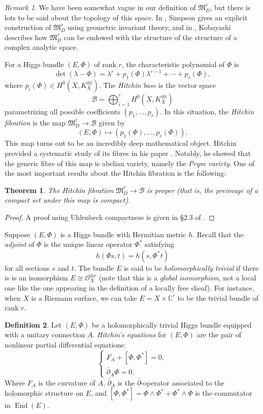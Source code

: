 \documentclass[10pt]{amsart}
\numberwithin{equation}{section}
\def\~#1{\mathscr{#1}}
\newcommand{\C}{\mathbb{C}}
\DeclareMathOperator{\End}{End}
\renewcommand{\frak}[1]{\mathfrak{#1}}
\theoremstyle{plain}
\newtheorem{thm}{Theorem}[section]
\theoremstyle{definition}
\newtheorem{defn}[thm]{Definition}
\theoremstyle{remark}
\newtheorem*{rmk}{Remark}
\begin{document}
\begin{rmk}
    We have been somewhat vague in our definition of $\frak{M}_D^r$, but there is lots to be said about the topology of this space. In \cite{simpson1994}, Simpson gives an explicit construction of $\frak{M}_D^r$ using geometric invariant theory, and in \cite{kobayashi87}, Kobayashi describes how $\frak{M}_D^r$ can be endowed with the structure of the structure of a complex analytic space.
\end{rmk}

For a Higgs bundle $(E, \Phi)$ of rank $r$, the characteristic polynomial of $\Phi$ is
\[\det(\lambda - \Phi) = \lambda^r +p_1(\Phi) \lambda^{r-1} + \cdots + p_r(\Phi),\]
where $p_i(\Phi) \in H^0(X, K_X^{\otimes i})$. The \emph{Hitchin base} is the vector space
\[\~B = \bigoplus_{i=1}^r H^0(X, K_X^{\otimes i})\]
parametrizing all possible coefficients $(p_1, \hdots, p_r)$. In this situation, the \emph{Hitchin fibration} is the map $\frak{M}_D^r \to \~B$ given by
\[(E, \Phi) \mapsto (p_1(\Phi), \hdots, p_r(\Phi)).\]
This map turns out to be an incredibly deep mathematical object. Hitchin provided a systematic study of its fibres in his paper \cite{hitchin1987B}. Notably, he showed that the generic fibre of this map is abelian variety, namely the \emph{Prym variety}. One of the most important results about the Hitchin fibration is the following:
\begin{thm}
    The Hitchin fibration $\frak{M}_D^{r} \to \~B$ is proper (that is, the preimage of a compact set under this map is compact).
\end{thm}
\begin{proof}
A proof using Uhlenbeck compactness is given in \S2.3 of \cite{wentworth2015}.
\end{proof}
Suppose $(E, \Phi)$ is a Higgs bundle with Hermitian metric $h$. Recall that the \emph{adjoint} of $\Phi$ is the unique linear operator $\Phi^*$ satisfying
\[h(\Phi s, t) = h(s, \Phi^* t) \]
for all sections $s$ and $t$. The bundle $E$ is said to be \emph{holomorphically trivial} if there is is an isomorphism $E \cong \~O_X^{\oplus r}$ (note that this is a \emph{global isomorphism}, not a local one like the one appearing in the definition of a locally free sheaf). For instance, when $X$ is a Riemann surface, we can take $E = X \times \C^r$ to be the trivial bundle of rank $r$.

\begin{defn}
Let $(E, \Phi)$ be a holomorphically trivial Higgs bundle equipped with a unitary connection $A$. \emph{Hitchin's equations} for $(E, \Phi)$ are the pair of nonlinear partial differential equations:
\begin{equation}\label{eq:2.5}
\begin{cases}
F_A + [\Phi, \Phi^*] = 0, \\ 
\bar{\partial}_A \Phi = 0.
\end{cases}
\end{equation}
Where $F_A$ is the curvature of $A$, $\bar{\partial}_A$ is the $\overline{\partial}$-operator associated to the holomorphic structure on $E$, and $[\Phi, \Phi^*] = \Phi \wedge \Phi^* + \Phi^* \wedge \Phi$ is the commutator in $\End(E)$.  
\end{defn}
\end{document}
